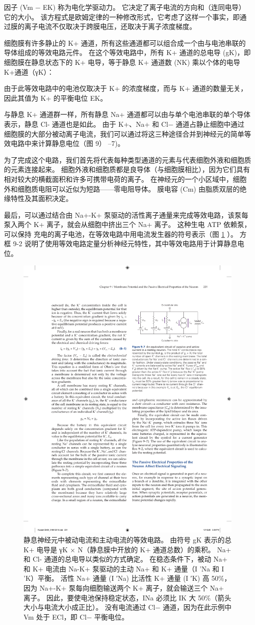 因子 (Vm − EK) 称为电化学驱动力。 
它决定了离子电流的方向和（连同电导）它的大小。 
该方程式是欧姆定律的一种修改形式，它考虑了这样一个事实，即通过膜的离子电流不仅取决于跨膜电压，还取决于离子浓度梯度。


细胞膜有许多静止的 K+ 通道，所有这些通道都可以组合成一个由与电池串联的导体组成的等效电路元件。 
在这个等效电路中，所有 K+ 通道的总电导 (gK)，即细胞膜在静息状态下的 K+ 电导，等于静息 K+ 通道数 (NK) 乘以个体的电导 K+通道（γK）：


由于此等效电路中的电池仅取决于 K+ 的浓度梯度，而与 K+ 通道的数量无关，因此其值为 K+ 的平衡电位 EK。


与静息 K+ 通道群一样，所有静息 Na+ 通道都可以由与单个电池串联的单个导体表示，静息 Cl- 通道也是如此。 
由于 K+、Na+ 和 Cl− 通道占静止细胞中通过细胞膜的大部分被动离子电流，我们可以通过将这三种途径合并到神经元的简单等效电路中来计算静息电位（图 9） –7)。


为了完成这个电路，我们首先将代表每种类型通道的元素与代表细胞外液和细胞质的元素连接起来。 
细胞外液和细胞质都是良导体（与细胞膜相比），因为它们具有相对较大的横截面积和许多可携带电荷的离子。 
在神经元的一个小区域中，细胞外和细胞质电阻可以近似为短路——零电阻导体。 
膜电容 (Cm) 由脂质双层的绝缘特性及其面积决定。


最后，可以通过结合由 Na+-K+ 泵驱动的活性离子通量来完成等效电路，该泵每泵入两个 K+ 离子，就会从细胞中挤出三个 Na+ 离子。
这种生电 ATP 依赖泵，可以保持 充电的离子电池，在等效电路中用电流发生器的符号表示（图 \ref{fig:9_7} ）。 
方框 9-2 说明了使用等效电路定量分析神经元特性，其中等效电路用于计算静息电位。

\begin{figure}[htbp]
	\centering
	\includegraphics[width=0.5\linewidth]{chap09/fig_9_7}
	\caption{静息神经元中被动电流和主动电流的等效电路。 由符号 gK 表示的总 K+ 电导是 γK × N（静息膜中开放的 K+ 通道总数）的乘积。 Na+ 和 Cl- 通道的总电导以类似的方式确定。 在稳态条件下，被动 Na+ 和 K+ 电流由 Na-K+ 泵驱动的主动 Na+ 和 K+ 通量（I 'Na 和 I 'K）平衡。 活性 Na+ 通量 (I ′Na) 比活性 K+ 通量 (I ′K) 高 50\%，因为 Na+-K+ 泵每向细胞输送两个 K+ 离子，就会输送三个 Na+ 离子。 因此，要使电池保持稳定状态，INa 必须比 IK 大 50\%（箭头大小与电流大小成正比）。 没有电流通过 Cl− 通道，因为在此示例中 Vm 处于 ECl，即 Cl− 平衡电位。}
	\label{fig:9_7}
\end{figure}



